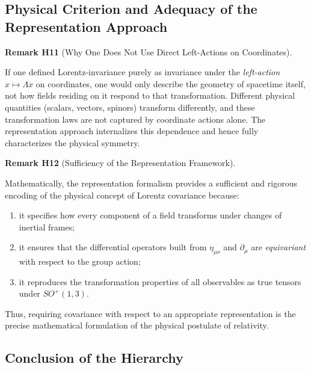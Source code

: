 \documentclass[10pt, letterpaper]{article}
\newcommand{\CustomHeading}[3]{%
  \par\medskip\noindent%
  \textbf{#1 #2} \textnormal{(#3)}.\enskip%
}
\newenvironment{REM}[2]{\begin{unitbox}\CustomHeading{Remark}{#1}{#2}}{\end{unitbox}}
\begin{document}
\subsection{Physical Criterion and Adequacy of the Representation Approach}

\begin{REM}{H11}{Why One Does Not Use Direct Left-Actions on Coordinates}
If one defined Lorentz-invariance purely as invariance under the \emph{left-action} $x\mapsto \Lambda x$ on coordinates, one would only describe the geometry of spacetime itself, not how fields residing on it respond to that transformation.  
Different physical quantities (scalars, vectors, spinors) transform differently, and these transformation laws are not captured by coordinate actions alone.  
The representation approach internalizes this dependence and hence fully characterizes the physical symmetry.
\end{REM}

\begin{REM}{H12}{Sufficiency of the Representation Framework}
Mathematically, the representation formalism provides a sufficient and rigorous encoding of the physical concept of Lorentz covariance because:
\begin{enumerate}[label=\roman*)]
\item it specifies how every component of a field transforms under changes of inertial frames;
\item it ensures that the differential operators built from $\eta_{\mu\nu}$ and $\partial_\mu$ are \emph{equivariant} with respect to the group action;
\item it reproduces the transformation properties of all observables as true tensors under $SO^+(1,3)$.
\end{enumerate}
Thus, requiring covariance with respect to an appropriate representation is the precise mathematical formulation of the physical postulate of relativity.
\end{REM}

\subsection{Conclusion of the Hierarchy}
\end{document}
